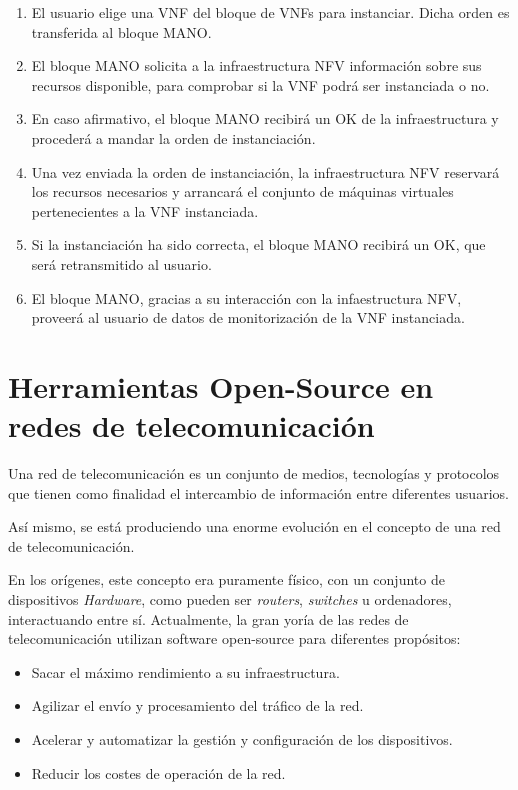 \begin{enumerate}
	\item El usuario elige una VNF del bloque de VNFs para instanciar. Dicha orden es transferida al bloque MANO.
	\item El bloque MANO solicita a la infraestructura NFV información sobre sus recursos disponible, para comprobar si la VNF podrá ser instanciada o no.
	\item En caso afirmativo, el bloque MANO recibirá un OK de la infraestructura y procederá a mandar la orden de instanciación.
	\item Una vez enviada la orden de instanciación, la infraestructura NFV reservará los recursos necesarios y arrancará el conjunto de máquinas virtuales pertenecientes a la VNF instanciada.
	\item Si la instanciación ha sido correcta, el bloque MANO recibirá un OK, que será retransmitido al usuario.
	\item El bloque MANO, gracias a su interacción con la infaestructura NFV, proveerá al usuario de datos de monitorización de la VNF instanciada.
\end{enumerate}


\section{Herramientas Open-Source en redes de telecomunicación}
\label{sec:opensourcenets}

Una red de telecomunicación es un conjunto de medios, tecnologías y protocolos que tienen como finalidad el intercambio de información entre diferentes usuarios.

Así mismo, se está produciendo una enorme evolución en el concepto de una red de telecomunicación. 

En los orígenes, este concepto era puramente físico, con un conjunto de dispositivos \textit{Hardware}, como pueden ser \textit{routers}, \textit{switches} u ordenadores, interactuando entre sí. Actualmente, la gran yoría de las redes de telecomunicación utilizan software open-source para diferentes propósitos:

\begin{itemize}
	\item Sacar el máximo rendimiento a su infraestructura.
	\item Agilizar el envío y procesamiento del tráfico de la red.
	\item Acelerar y automatizar la gestión y configuración de los dispositivos.
	\item Reducir los costes de operación de la red.
\end{itemize}

